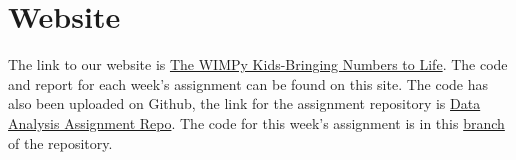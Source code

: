 \documentclass{extarticle}
\begin{document}
	\section{\color{Blue} Website}
		The link to our website is \href{https://thewimpykids.wordpress.com}{The WIMPy Kids-Bringing Numbers to Life}. The 			code and report for each week's assignment can be found on this site. The code has also been uploaded on Github, the link 			for the assignment repository is \href{https://github.com/The-WIMPy-Kids/Data-Analysis-Assignment.git}{Data Analysis 			Assignment Repo}. The code for this week's assignment is in this
		\href{https://github.com/The-WIMPy-Kids/Data-Analysis-Assignment/tree/analytical}{branch} of the repository.
\end{document}
